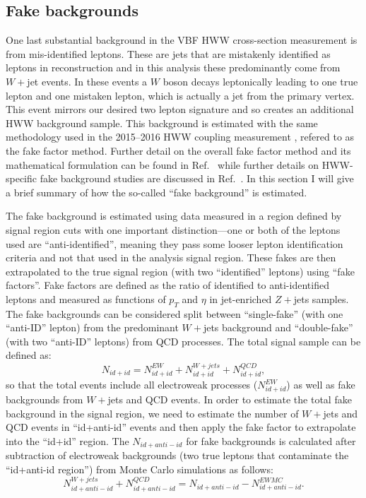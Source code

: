 \subsection{Fake backgrounds}
One last substantial background in the VBF HWW cross-section measurement is from mis-identified leptons. These are jets that are mistakenly identified as leptons in reconstruction and in this analysis these predominantly come from $W+$jet events. In these events a $W$ boson decays leptonically leading to one true lepton and one mistaken lepton, which is actually a jet from the primary vertex. This event mirrors our desired two lepton signature and so creates an additional HWW background sample. This background is estimated with the same methodology used in the 2015--2016 HWW coupling measurement \cite{Aaboud_2019},  refered to as the fake factor method. Further detail on the overall fake factor method and its mathematical formulation can be found in Ref.~\cite{fakefactormethod} while further details on HWW-specific fake background studies are discussed in Ref.~\cite{Aaboud_2019}. In this section I will give a brief summary of how the so-called ``fake background'' is estimated. 

The fake background is estimated using data measured in a region defined by signal region cuts with one important distinction---one or both of the leptons used are ``anti-identified'', meaning they pass some looser lepton identification criteria and not that used in the analysis signal region. These fakes are then extrapolated to the true signal region (with two ``identified'' leptons) using ``fake factors''. Fake factors are defined as the ratio of identified to anti-identified leptons and measured as functions of $p_T$ and $\eta$ in jet-enriched $Z+$jets samples. The fake backgrounds can be considered split between ``single-fake'' (with one ``anti-ID'' lepton) from the predominant $W+$jets background and ``double-fake'' (with two ``anti-ID'' leptons) from QCD processes. The total signal sample can be defined as: 
\begin{equation}
N_{id+id} = N^{EW}_{id+id}+N^{W+jets}_{id+id}+N^{QCD}_{id+id},
\end{equation} 
so that the total events include all electroweak processes ($N^{EW}_{id+id}$) as well as fake backgrounds from $W+$jets and QCD events. In order to estimate the total fake background in the signal region, we need to estimate the number of $W+$jets and QCD events in ``id+anti-id'' events and then apply the fake factor to extrapolate into the ``id+id'' region. The $N_{id+anti-id}$ for fake backgrounds is calculated after subtraction of electroweak backgrounds (two true leptons that contaminate the ``id+anti-id region'') from Monte Carlo simulations as follows:
\begin{equation}
N^{W+jets}_{id+anti-id}+N^{QCD}_{id+anti-id}=N_{id+anti-id}-N^{EW MC}_{id+anti-id}.
\end{equation}
 
